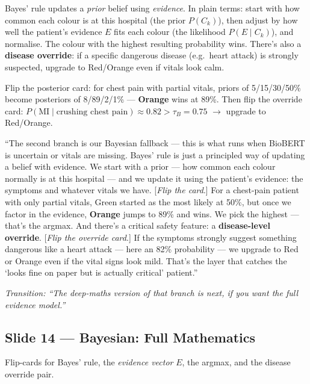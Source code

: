 \documentclass[11pt]{article}
\newcommand{\chip}[2]{\textcolor{#1}{\textbf{#2}}}
\newcommand{\transition}[1]{\medskip\noindent\textit{\textcolor{mutel}{Transition: #1}}\medskip}
\newcommand{\route}[1]{{\small\texttt{\textcolor{mutel}{#1}}}}
\newcommand{\slide}[3]{%
  \subsection{Slide #1 --- #2}%
  \noindent\route{Route: #3}\par\smallskip}
\begin{document}
\begin{idea}
Bayes' rule updates a \emph{prior} belief using \emph{evidence}. In plain terms: start with how common
each colour is at this hospital (the prior $P(C_k)$), then adjust by how well the patient's evidence $E$
fits each colour (the likelihood $P(E\mid C_k)$), and normalise. The colour with the highest resulting
probability wins. There's also a \textbf{disease override}: if a specific dangerous disease (e.g.\ heart
attack) is strongly suspected, upgrade to Red/Orange even if vitals look calm.
\end{idea}

\begin{demo}
Flip the posterior card: for chest pain with partial vitals, priors of 5/15/30/50\% become posteriors of
8/89/2/1\% --- \chip{satOrange}{Orange} wins at 89\%. Then flip the override card: $P(\text{MI}\mid
\text{crushing chest pain})\approx0.82 > \tau_B = 0.75$ $\rightarrow$ upgrade to Red/Orange.
\end{demo}

\begin{saybox}
``The second branch is our Bayesian fallback --- this is what runs when BioBERT is uncertain or vitals are
missing. Bayes' rule is just a principled way of updating a belief with evidence. We start with a prior ---
how common each colour normally is at this hospital --- and we update it using the patient's evidence: the
symptoms and whatever vitals we have. [\emph{Flip the card}.] For a chest-pain patient with only partial
vitals, Green started as the most likely at 50\%, but once we factor in the evidence, \chip{satOrange}{Orange}
jumps to 89\% and wins. We pick the highest --- that's the argmax. And there's a critical safety feature:
a \textbf{disease-level override}. [\emph{Flip the override card}.] If the symptoms strongly suggest
something dangerous like a heart attack --- here an 82\% probability --- we upgrade to Red or Orange even if
the vital signs look mild. That's the layer that catches the `looks fine on paper but is actually
critical' patient.''
\end{saybox}

\transition{``The deep-maths version of that branch is next, if you want the full evidence model.''}

\slide{14}{Bayesian: Full Mathematics}{/dashboard/math/bayesian}

\begin{onscreen}
Flip-cards for Bayes' rule, the \emph{evidence vector} $E$, the argmax, and the disease override pair.
\end{onscreen}
\end{document}
